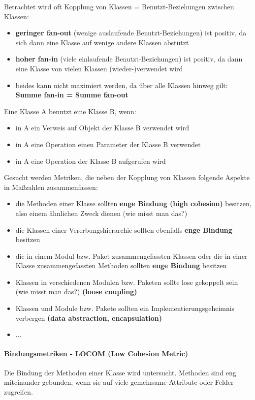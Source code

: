 Betrachtet wird oft Kopplung von Klassen = Benutzt-Beziehungen zwischen Klassen:
\begin{itemize}
	\item \textbf{geringer fan-out} (wenige auslaufende Benutzt-Beziehungen) ist positiv, da sich dann eine Klasse auf wenige andere Klassen abstützt
	\item \textbf{hoher fan-in} (viele einlaufende Benutzt-Beziehungen) ist positiv, da dann eine Klasse von vielen Klassen (wieder-)verwendet wird
	\item beides kann nicht maximiert werden, da über alle Klassen hinweg gilt: \textbf{Summe fan-in = Summe fan-out}
\end{itemize}
Eine Klasse A benutzt eine Klasse B, wenn:
\begin{itemize}
	\item in A ein Verweis auf Objekt der Klasse B verwendet wird
	\item in A eine Operation einen Parameter der Klasse B verwendet
	\item in A eine Operation der Klasse B aufgerufen wird
\end{itemize}
Gesucht werden Metriken, die neben der Kopplung von Klassen folgende Aspekte in Maßzahlen zusammenfassen:
\begin{itemize}
	\item die Methoden einer Klasse sollten \textbf{enge Bindung (high cohesion)} besitzen, also einem ähnlichen Zweck dienen (wie misst man das?)
	\item die Klassen einer Vererbungshierarchie sollten ebenfalls \textbf{enge Bindung} besitzen
	\item die in einem Modul bzw. Paket zusammengefassten Klassen oder die in einer Klasse zusammengefassten Methoden sollten \textbf{enge Bindung} besitzen
	\item Klassen in verschiedenen Modulen bzw. Paketen sollte lose gekoppelt sein (wie misst man das?) \textbf{(loose coupling)}
	\item Klassen und Module bzw. Pakete sollten ein Implementierungsgeheimnis verbergen \textbf{(data abstraction, encapsulation)} 
	\item ...
\end{itemize}

\paragraph{Bindungsmetriken - LOCOM (Low Cohesion Metric)}
Die Bindung der Methoden einer Klasse wird untersucht. Methoden sind eng miteinander gebunden, wenn sie auf viele gemeinsame Attribute oder Felder zugreifen. 
\\
\\

